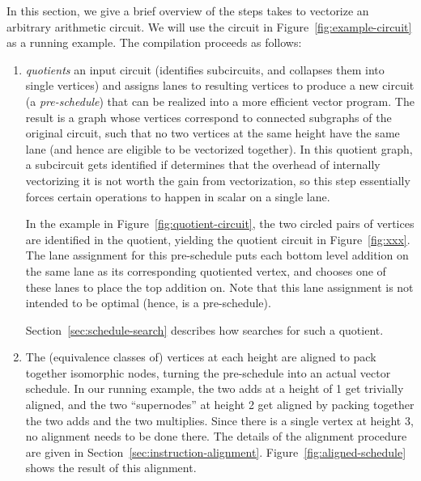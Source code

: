 In this section, we give a brief overview of the steps \system takes to vectorize an arbitrary arithmetic circuit.
We will use the circuit in Figure~\ref{fig:example-circuit} as a running example.
The compilation proceeds as follows:
\begin{enumerate}
    \item \system \textit{quotients} an input circuit (identifies subcircuits, and collapses them into single vertices) and assigns lanes to resulting vertices to produce a new circuit (a {\em pre-schedule}) that can be realized into a more efficient vector program. The result is a graph whose vertices correspond to connected subgraphs of the original circuit, such that no two vertices at the same height have the same lane (and hence are eligible to be vectorized together). In this quotient graph, a subcircuit gets identified if \system determines that the overhead of internally vectorizing it is not worth the gain from vectorization, so this step essentially forces certain operations to happen in scalar on a single lane. 
    
    In the example in Figure~\ref{fig:quotient-circuit}, the two circled pairs of vertices are identified in the quotient, yielding the quotient circuit in Figure~\ref{fig:xxx}. 
    The lane assignment for this pre-schedule puts each bottom level addition on the same lane as its corresponding quotiented vertex, and chooses one of these lanes to place the top addition on. Note that this lane assignment is not intended to be optimal (hence, is a pre-schedule).

    Section~\ref{sec:schedule-search} describes how \system searches for such a quotient. 
    
    \item The (equivalence classes of) vertices at each height are aligned to pack together isomorphic nodes, turning the pre-schedule into an actual vector schedule. 
    In our running example, the two adds at a height of 1 get trivially aligned, and the two ``supernodes'' at height 2 get aligned by packing together the two adds and the two multiplies.
    Since there is a single vertex at height 3, no alignment needs to be done there. 
    The details of the alignment procedure are given in Section~\ref{sec:instruction-alignment}.
    Figure~\ref{fig:aligned-schedule} shows the result of this alignment.
    

\end{enumerate}
